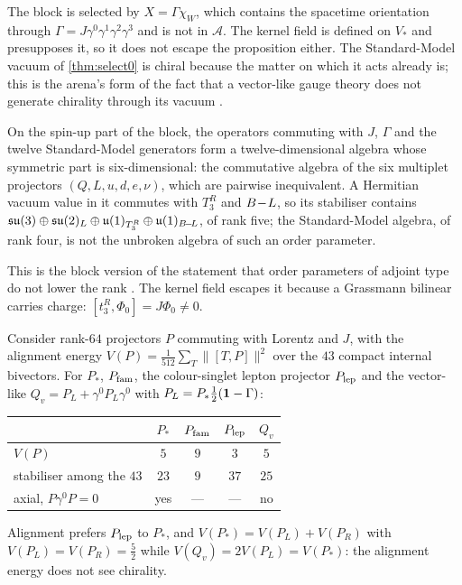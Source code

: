 The block is selected by $X=\Gamma\chi_W$, which contains the spacetime orientation through $\Gamma=J\gamma^0\gamma^1\gamma^2\gamma^3$ and is not in $\mathcal A$. The kernel field
is defined on $V_*$ and presupposes it, so it does not escape the proposition either. The Standard-Model vacuum of \cref{thm:select0} is chiral because the
matter on which it acts already is; this is the arena's form of the fact that a vector-like gauge theory does not generate chirality through its vacuum
\cite{VafaWitten84b}.

\begin{proposition}
\label{prop:rankfive}
On the spin-up part of the block, the operators commuting with $J$, $\Gamma$ and the twelve Standard-Model generators form a twelve-dimensional algebra whose
symmetric part is six-dimensional: the commutative algebra of the six multiplet projectors $(Q,L,u,d,e,\nu)$, which are pairwise inequivalent. A Hermitian vacuum
value in it commutes with $T^R_3$ and $B\!-\!L$, so its stabiliser contains $\mathfrak{su}(3)\oplus\mathfrak{su}(2)_L\oplus\mathfrak{u}(1)_{T^R_3}\oplus\mathfrak{u}(1)_{B\!-\!L}$, of rank five; the Standard-Model algebra, of
rank four, is not the unbroken algebra of such an order parameter.
\end{proposition}

This is the block version of the statement that order parameters of adjoint type do not lower the rank \cite{Li74}. The kernel field escapes it because a
Grassmann bilinear carries charge: $[t^R_3,\Phi_0]=J\Phi_0\neq0$.

\begin{proposition}
\label{prop:alignment}
Consider rank-$64$ projectors $P$ commuting with Lorentz and $J$, with the alignment energy $V(P)=\tfrac1{512}\sum_T\|[T,P]\|^2$ over the $43$ compact internal
bivectors. For $P_*$, $P_{\rm fam}$, the colour-singlet lepton projector $P_{\rm lep}$ and the vector-like $Q_v=P_L+\gamma^0P_L\gamma^0$ with $P_L=P_*\tfrac12(\mathbf 1-\Gamma)$:
\begin{center}
\small
\begin{tabular}{@{}lcccc@{}}
\toprule
 & $P_*$ & $P_{\rm fam}$ & $P_{\rm lep}$ & $Q_v$\\
\midrule
$V(P)$ & $5$ & $9$ & $3$ & $5$\\
stabiliser among the $43$ & $23$ & $9$ & $37$ & $25$\\
axial, $P\gamma^0P=0$ & yes & --- & --- & no\\
\bottomrule
\end{tabular}
\end{center}
Alignment prefers $P_{\rm lep}$ to $P_*$, and $V(P_*)=V(P_L)+V(P_R)$ with $V(P_L)=V(P_R)=\tfrac52$ while $V(Q_v)=2V(P_L)=V(P_*)$: the alignment energy does not see
chirality.
\end{proposition}

